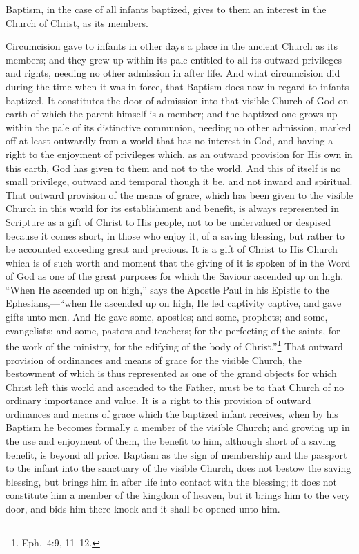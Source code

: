 \documentclass[
  english,
]{book}
\begin{document}
Baptism, in the case of all infants baptized, gives to them an interest in the Church of Christ, as its members.

Circumcision gave to infants in other days a place in the ancient Church as its members; and they grew up within its pale entitled to all its outward privileges and rights, needing no other admission in after life. And what circumcision did during the time when it was in force, that Baptism does now in regard to infants baptized. It constitutes the door of admission into that visible Church of God on earth of which the parent himself is a member; and the baptized one grows up within the pale of its distinctive communion, needing no other admission, marked off at least outwardly from a world that has no interest in God, and having a right to the enjoyment of privileges which, as an outward provision for His own in this earth, God has given to them and not to the world. And this of itself is no small privilege, outward and temporal though it be, and not inward and spiritual. That outward provision of the means of grace, which has been given to the visible Church in this world for its establishment and benefit, is always represented in Scripture as a gift of Christ to His people, not to be undervalued or despised because it comes short, in those who enjoy it, of a saving blessing, but rather to be accounted exceeding great and precious. It is a gift of Christ to His Church which is of such worth and moment that the giving of it is spoken of in the Word of God as one of the great purposes for which the Saviour ascended up on high. ``When He ascended up on high,'' says the Apostle Paul in his Epistle to the Ephesians,---``when He ascended up on high, He led captivity captive, and gave gifts unto men. And He gave some, apostles; and some, prophets; and some, evangelists; and some, pastors and teachers; for the perfecting of the saints, for the work of the ministry, for the edifying of the body of Christ.''\footnote{Eph.~4:9, 11--12.} That outward provision of ordinances and means of grace for the visible Church, the bestowment of which is thus represented as one of the grand objects for which Christ left this world and ascended to the Father, must be to that Church of no ordinary importance and value. It is a right to this provision of outward ordinances and means of grace which the baptized infant receives, when by his Baptism he becomes formally a member of the visible Church; and growing up in the use and enjoyment of them, the benefit to him, although short of a saving benefit, is beyond all price. Baptism as the sign of membership and the passport to the infant into the sanctuary of the visible Church, does not bestow the saving blessing, but brings him in after life into contact with the blessing; it does not constitute him a member of the kingdom of heaven, but it brings him to the very door, and bids him there knock and it shall be opened unto him.
\end{document}
